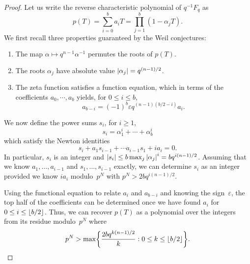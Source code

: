 \begin{proof}
Let us write the reverse characteristic polynomial of $q^{-1} F_q$ as 
\begin{equation*}
p(T) = \sum_{i=0}^{b} a_i T = \prod_{j=1}^{b} (1 - \alpha_j T).
\end{equation*}
We first recall three properties guaranteed by the Weil conjectures:
\begin{enumerate}
\item The map $\alpha \mapsto q^{n-1} \alpha^{-1}$ permutes the roots of $p(T)$.
\item The roots $\alpha_j$ have absolute value $\lvert\alpha_j\rvert = q^{(n-1)/2}$.
\item The zeta function satisfies a function equation, which in terms of 
      the coefficients $a_0, \dotsb, a_b$ yields, for $0 \leq i \leq b$, 
      \begin{equation*}
      a_{b-i} = (-1)^b \varepsilon q^{(n-1) (b/2 - i)} a_i.
      \end{equation*}
\end{enumerate}

We now define the power sums $s_i$, for $i \geq 1$, 
\begin{equation*}
s_i = \alpha_{1}^i + \dotsb + \alpha_{b}^i
\end{equation*}
which satisfy the Newton identities 
\begin{equation*}
s_i + a_1 s_{i-1} + \dotsb a_{i-1} s_1 + i a_i = 0.
\end{equation*}
In particular, $s_i$ is an integer and 
$\lvert s_i\rvert \leq b \max_j{\lvert\alpha_j\rvert}^i = b q^{i(n-1)/2}$.
Assuming that we know $a_1, \dotsc, a_{i-1}$ and $s_1, \dotsc, s_{i-1}$ 
exactly, we can determine $s_i$ as an integer provided we know 
$i a_i$ modulo~$p^N$ with \mbox{$p^N > 2 b q^{i(n-1)/2}$}.

Using the functional equation to relate $a_{i}$ and $a_{b-i}$ 
and knowing the sign~$\varepsilon$, the top half of the coefficients 
can be determined once we have found $a_i$ for $0 \leq i \leq \lfloor b/2\rfloor$.
Thus, we can recover $p(T)$ as a polynomial over the integers 
from its residue modulo~$p^N$ where 
\begin{equation*}
p^N > \max \biggl\{ \frac{2b q^{k(n-1)/2}}{k} : 0 \leq k \leq \lfloor b/2\rfloor \biggr\}.
\end{equation*}


\end{proof}

